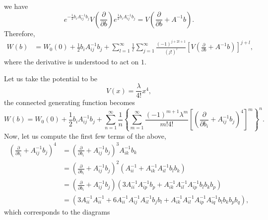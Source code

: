 \begin{solution}
\begin{equation}
    \end{equation}
    we have
    \begin{equation}
        e^{-\frac{1}{2}b_iA_{ij}^{-1}b_j}V\left(\frac{\partial}{\partial b}\right)e^{\frac{1}{2}b_iA_{ij}^{-1}b_j} = V\left(\frac{\partial}{\partial b} + A^{-1}b\right).
    \end{equation}
    Therefore,
    \begin{equation}
        \begin{aligned}
            W(b) &= W_0(0) + \frac{1}{2}b_iA_{ij}^{-1}b_j+ \sum_{l=1}^\infty\frac{1}{l}\sum_{j=1}^\infty\frac{(-1)^{j+2l+1}}{(j!)^l}\left[V\left(\frac{\partial}{\partial b} + A^{-1}b\right)\right]^{j+l},
        \end{aligned}
    \end{equation}
    where the derivative is understood to act on $1$.

    Let us take the potential to be
    \begin{equation}
        V(x) = \frac{\lambda}{4!}x^4,
    \end{equation}
    the connected generating function becomes
    \begin{equation}
        W(b) = W_0(0) + \frac{1}{2}b_iA_{ij}^{-1}b_j + \sum_{n=1}^\infty\frac{1}{n}\left\{\sum_{m=1}^\infty\frac{(-1)^{m+1}\lambda^m}{m!4!}\left[\left(\frac{\partial}{\partial b_i} + A^{-1}_{ij}b_j\right)^4\right]^{m}\right\}^n.
    \end{equation}
    Now, let us compute the first few terms of the above,
    \begin{equation}
        \begin{aligned}
            \left(\frac{\partial}{\partial b_i} + A^{-1}_{ij}b_j\right)^4 &=\left(\frac{\partial}{\partial b_i} + A^{-1}_{ij}b_j\right)^3A_{ik}^{-1}b_k\\
            &=\left(\frac{\partial}{\partial b_i} + A^{-1}_{ij}b_j\right)^2(A_{ii}^{-1}+A_{ik}^{-1}A_{il}^{-1}b_lb_k)\\
            &=\left(\frac{\partial}{\partial b_i} + A^{-1}_{ij}b_j\right)(3A_{ii}^{-1}A_{ip}^{-1}b_p + A_{ik}^{-1}A_{il}^{-1}A_{ip}^{-1}b_lb_kb_p)\\
            &=(3A_{ii}^{-1}A_{ii}^{-1} + 6 A_{ii}^{-1}A_{ij}^{-1}A_{il}^{-1}b_jb_l + A_{ik}^{-1}A_{il}^{-1}A_{ip}^{-1}A_{iq}^{-1}b_lb_kb_pb_q),
        \end{aligned}
    \end{equation}
    which corresponds to the diagrams
\newcommand{\FDone}{%
\vcenter{\hbox{\begin{tikzpicture}[thick]
  \coordinate (v) at (0,0);
  \fill (v) circle (1.5pt);
  \draw (v) ++(-0.4,0) circle (0.4);
  \draw (v) ++( 0.4,0) circle (0.4);
\end{tikzpicture}}}%
}


\end{solution}
